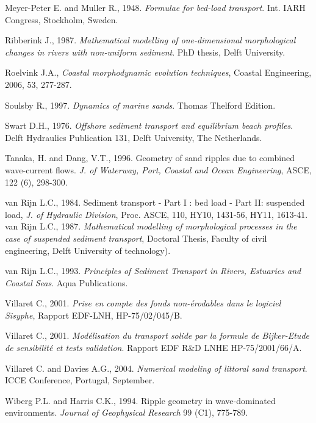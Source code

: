 \begin{thebibliography}{25}
Meyer-Peter E. and Muller R., 1948. \emph{Formulae for bed-load
transport}. Int. IARH Congress, Stockholm, Sweden. 

Ribberink J., 1987. \emph{Mathematical modelling of one-dimensional morphological
changes in rivers with non-uniform sediment}. PhD thesis, Delft University.

 Roelvink J.A., \emph{Coastal morphodynamic evolution techniques}, Coastal Engineering, 2006, 53, 277-287.

Soulsby R., 1997. \emph{Dynamics of marine sands}. Thomas Thelford Edition.

Swart D.H., 1976. \emph{Offshore sediment transport and
equilibrium beach profiles}. Delft Hydraulics Publication 131, Delft University,
The Netherlands.

Tanaka, H. and Dang, V.T., 1996. Geometry of sand ripples due
to combined wave-current flows. \emph{J. of Waterway, Port, Coastal and Ocean
Engineering}, ASCE, 122 (6), 298-300.

van Rijn L.C., 1984. Sediment transport - Part I : bed load -
Part II: suspended load, \emph{J. of Hydraulic Division}, Proc. ASCE, 110, HY10,
1431-56, HY11, 1613-41.\\

van Rijn L.C., 1987. \emph{Mathematical modelling of morphological processes in
the case of suspended sediment transport}, Doctoral Thesis, Faculty of civil
engineering, Delft University of technology).

van Rijn L.C., 1993. \emph{Principles of Sediment Transport in
Rivers, Estuaries and Coastal Seas}. Aqua Publications.

Villaret C., 2001. \emph{Prise en compte des fonds non-\'{e}rodables
dans le logiciel Sisyphe}, Rapport EDF-LNH, HP-75/02/045/B.

Villaret C., 2001. \emph{Mod\'{e}lisation du transport solide par la
formule de Bijker-Etude de sensibilit\'{e} et tests validation}. Rapport EDF
R\&D LNHE HP-75/2001/66/A.

Villaret C. and Davies A.G., 2004. \emph{Numerical modeling of
littoral sand transport}. ICCE Conference, Portugal, September.

Wiberg P.L. and Harris C.K., 1994. Ripple geometry in
wave-dominated environments. \emph{Journal of Geophysical Research} 99 (C1),
775-789.


\end{thebibliography}
